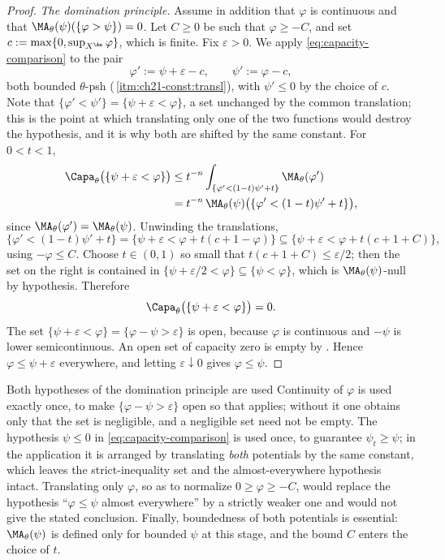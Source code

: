 \begin{proof}
\emph{The domination principle.}  Assume in addition that $\varphi$ is
continuous and that $\MA_\theta(\psi)(\{\varphi>\psi\})=0$.  Let $C\geq0$
be such that $\varphi\geq-C$, and set
$c:=\max\{0,\sup_{X^{\An}}\varphi\}$, which is finite.  Fix
$\varepsilon>0$.  We apply \eqref{eq:capacity-comparison} to the pair
\[
 \varphi':=\psi+\varepsilon-c,\qquad
 \psi':=\varphi-c ,
\]
both bounded $\theta$-psh
(\,\cref{itm:ch21-const:transl}), with
$\psi'\leq0$ by the choice of $c$.  Note that
$\{\varphi'<\psi'\}=\{\psi+\varepsilon<\varphi\}$, a set unchanged by the
common translation; this is the point at which translating only one of the
two functions would destroy the hypothesis, and it is why both are shifted
by the same constant.  For $0<t<1$,
\[
 \begin{aligned}
 \Capa_\theta\bigl(\{\psi+\varepsilon<\varphi\}\bigr)
 &\leq t^{-n}
   \int_{\{\varphi'<(1-t)\psi'+t\}}\MA_\theta(\varphi')\\
 &=t^{-n}\,\MA_\theta(\psi)
   \bigl(\{\varphi'<(1-t)\psi'+t\}\bigr),
 \end{aligned}
\]
since $\MA_\theta(\varphi')=\MA_\theta(\psi)$.  Unwinding the translations,
\[
 \{\varphi'<(1-t)\psi'+t\}
 =\bigl\{\psi+\varepsilon<\varphi+t(c+1-\varphi)\bigr\}
 \subseteq\bigl\{\psi+\varepsilon<\varphi+t(c+1+C)\bigr\},
\]
using $-\varphi\leq C$.  Choose $t\in(0,1)$ so small that
$t(c+1+C)\leq\varepsilon/2$; then the set on the right is contained in
$\{\psi+\varepsilon/2<\varphi\}\subseteq\{\psi<\varphi\}$, which is
$\MA_\theta(\psi)$-null by hypothesis.  Therefore
\[
 \Capa_\theta\bigl(\{\psi+\varepsilon<\varphi\}\bigr)=0 .
\]
The set $\{\psi+\varepsilon<\varphi\}=\{\varphi-\psi>\varepsilon\}$ is
open, because $\varphi$ is continuous and $-\psi$ is lower
semicontinuous.  An open set of capacity zero is empty by
.  Hence
$\varphi\leq\psi+\varepsilon$ everywhere, and letting
$\varepsilon\downarrow0$ gives $\varphi\leq\psi$.
\end{proof}

\begin{warning}{Both hypotheses of the domination principle are used}
Continuity of $\varphi$ is used exactly once, to make
$\{\varphi-\psi>\varepsilon\}$ open so that
 applies; without it one obtains only
that the set is negligible, and a negligible set need not be empty.  The
hypothesis $\psi\leq0$ in \eqref{eq:capacity-comparison} is used once, to
guarantee $\psi_t\geq\psi$; in the application it is arranged by
translating \emph{both} potentials by the same constant, which leaves the
strict-inequality set and the almost-everywhere hypothesis intact.
Translating only $\varphi$, so as to normalize $0\geq\varphi\geq-C$,
would replace the hypothesis ``$\varphi\leq\psi$ almost everywhere'' by a
strictly weaker one and would not give the stated conclusion.  Finally,
boundedness of both potentials is essential: $\MA_\theta(\psi)$ is defined
only for bounded $\psi$ at this stage, and the bound $C$ enters the
choice of $t$.
\end{warning}

